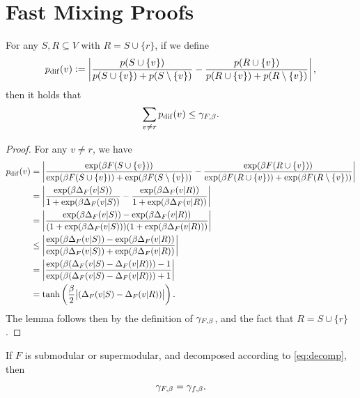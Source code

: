 \section{Fast Mixing Proofs}

\let\oldthelemma\thelemma
\renewcommand{\thelemma}{B.1}
\begin{lemma}
For any $S, R \subseteq V$ with $R = S \cup \{r\}$, if we define
\begin{align*}
  p_{\mathrm{dif}}(v) \vcentcolon= \left|\frac{p(S \cup \{v\})}{p(S \cup \{v\}) + p(S \setminus \{v\})} - \frac{p(R \cup \{v\})}{p(R \cup \{v\}) + p(R \setminus \{v\})}\right|,
\end{align*}
then it holds that
\begin{align*}
  \sum_{v \neq r}p_{\mathrm{dif}}(v) \leq \gamma_{F,\beta}.
\end{align*}
\end{lemma}
\let\thelemma\oldthelemma

\begin{proof}
  For any $v \neq r$, we have
  \begin{align*}
    p_{\mathrm{dif}}(v) &= \left|\frac{\exp(\beta F(S \cup \{v\}))}{\exp(\beta F(S \cup \{v\})) + \exp(\beta F(S \setminus \{v\}))} - \frac{\exp(\beta F(R \cup \{v\}))}{\exp(\beta F(R \cup \{v\})) + \exp(\beta F(R \setminus \{v\}))}\right|\\
    &= \left|\frac{\exp(\beta \Delta_F(v|S))}{1 + \exp(\beta \Delta_F(v|S))} - \frac{\exp(\beta \Delta_F(v|R))}{1 + \exp(\beta \Delta_F(v|R))}\right|\\
    &= \left|\frac{\exp(\beta \Delta_F(v|S)) - \exp(\beta \Delta_F(v|R))}{(1 + \exp(\beta \Delta_F(v|S)))(1 + \exp(\beta \Delta_F(v|R)))}\right|\\
    &\leq \left|\frac{\exp(\beta \Delta_F(v|S)) - \exp(\beta \Delta_F(v|R))}{\exp(\beta \Delta_F(v|S)) + \exp(\beta \Delta_F(v|R))}\right|\\
    &= \left|\frac{\exp(\beta (\Delta_F(v|S) - \Delta_F(v|R))) - 1}{\exp(\beta (\Delta_F(v|S) - \Delta_F(v|R))) + 1}\right|\\
    &= \tanh \left(\frac{\beta}{2}\big|(\Delta_F(v|S) - \Delta_F(v|R)) \big|\right).
  \end{align*}
  The lemma follows then by the definition of $\gamma_{F,\beta}$, and the fact that $R = S \cup \{r\}$.
\end{proof}

\let\oldthelemma\thelemma
\renewcommand{\thelemma}{B.2}
\begin{lemma}
  If $F$ is submodular or supermodular, and decomposed according to \eqref{eq:decomp}, then
  \begin{align*}
    \gamma_{F,\beta} = \gamma_{f,\beta}.
  \end{align*}
\end{lemma}
\let\thelemma\oldthelemma

